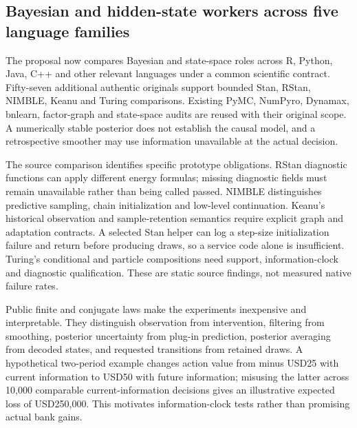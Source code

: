 \hypertarget{bayesian-and-hidden-state-workers-across-five-language-families}{%
\subsection{Bayesian and hidden-state workers across five language
families}\label{bayesian-and-hidden-state-workers-across-five-language-families}}

The proposal now compares Bayesian and state-space roles across R,
Python, Java, C++ and other relevant languages under a common scientific
contract. Fifty-seven additional authentic originals support bounded
Stan, RStan, NIMBLE, Keanu and Turing comparisons. Existing PyMC,
NumPyro, Dynamax, bnlearn, factor-graph and state-space audits are
reused with their original scope. A numerically stable posterior does
not establish the causal model, and a retrospective smoother may use
information unavailable at the actual decision.
\citep{exec25_bsw_stan,exec25_bsw_rstan,exec25_bsw_nimble,exec25_bsw_keanu,exec25_bsw_turing,exec23_pymc_sources,exec23_numpyro_sources,exec19_dynamax_source,exec24_bnlearn_sources,exec24_libdai_source,exec24_opengm_source}

The source comparison identifies specific prototype obligations. RStan
diagnostic functions can apply different energy formulas; missing
diagnostic fields must remain unavailable rather than being called
passed. NIMBLE distinguishes predictive sampling, chain initialization
and low-level continuation. Keanu's historical observation and
sample-retention semantics require explicit graph and adaptation
contracts. A selected Stan helper can log a step-size initialization
failure and return before producing draws, so a service code alone is
insufficient. Turing's conditional and particle compositions need
support, information-clock and diagnostic qualification. These are
static source findings, not measured native failure rates.
\citep{exec25_bsw_rstan,exec25_bsw_nimble,exec25_bsw_keanu,exec25_bsw_stan,exec25_bsw_turing}

Public finite and conjugate laws make the experiments inexpensive and
interpretable. They distinguish observation from intervention, filtering
from smoothing, posterior uncertainty from plug-in prediction, posterior
averaging from decoded states, and requested transitions from retained
draws. A hypothetical two-period example changes action value from minus
USD25 with current information to USD50 with future information;
misusing the latter across 10,000 comparable current-information
decisions gives an illustrative expected loss of USD250,000. This
motivates information-clock tests rather than promising actual bank
gains. \citep{exec25_bsw_choice}

